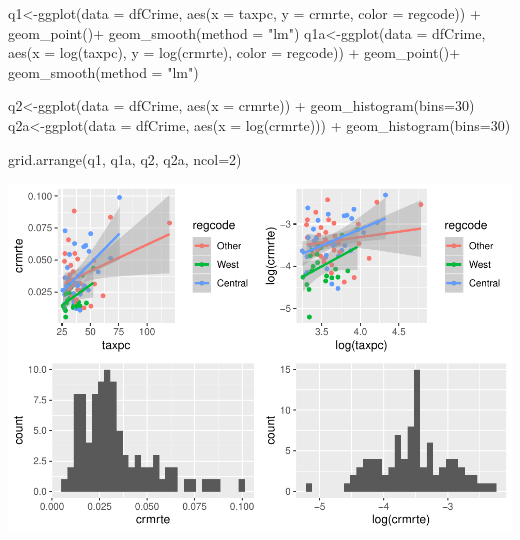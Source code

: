 \documentclass[]{article}
\newenvironment{Shaded}{}{}
\newcommand{\DataTypeTok}[1]{#1}
\newcommand{\DecValTok}[1]{#1}
\newcommand{\KeywordTok}[1]{\textcolor[rgb]{0.00,0.00,1.00}{#1}}
\newcommand{\NormalTok}[1]{#1}
\newcommand{\OperatorTok}[1]{#1}
\newcommand{\StringTok}[1]{\textcolor[rgb]{0.00,0.50,0.50}{#1}}
\begin{document}
\begin{Shaded}
\begin{Highlighting}[]
\NormalTok{q1<-}\KeywordTok{ggplot}\NormalTok{(}\DataTypeTok{data =}\NormalTok{ dfCrime, }\KeywordTok{aes}\NormalTok{(}\DataTypeTok{x =}\NormalTok{ taxpc, }\DataTypeTok{y =}\NormalTok{ crmrte, }\DataTypeTok{color =}\NormalTok{ regcode)) }\OperatorTok{+}
\StringTok{      }\KeywordTok{geom_point}\NormalTok{()}\OperatorTok{+}
\StringTok{  }\KeywordTok{geom_smooth}\NormalTok{(}\DataTypeTok{method =} \StringTok{"lm"}\NormalTok{)}
\NormalTok{q1a<-}\KeywordTok{ggplot}\NormalTok{(}\DataTypeTok{data =}\NormalTok{ dfCrime, }\KeywordTok{aes}\NormalTok{(}\DataTypeTok{x =} \KeywordTok{log}\NormalTok{(taxpc), }\DataTypeTok{y =} \KeywordTok{log}\NormalTok{(crmrte), }\DataTypeTok{color =}\NormalTok{ regcode)) }\OperatorTok{+}
\StringTok{      }\KeywordTok{geom_point}\NormalTok{()}\OperatorTok{+}
\StringTok{  }\KeywordTok{geom_smooth}\NormalTok{(}\DataTypeTok{method =} \StringTok{"lm"}\NormalTok{)}

\NormalTok{q2<-}\KeywordTok{ggplot}\NormalTok{(}\DataTypeTok{data =}\NormalTok{ dfCrime, }\KeywordTok{aes}\NormalTok{(}\DataTypeTok{x =}\NormalTok{ crmrte)) }\OperatorTok{+}
\StringTok{      }\KeywordTok{geom_histogram}\NormalTok{(}\DataTypeTok{bins=}\DecValTok{30}\NormalTok{)}
\NormalTok{q2a<-}\KeywordTok{ggplot}\NormalTok{(}\DataTypeTok{data =}\NormalTok{ dfCrime, }\KeywordTok{aes}\NormalTok{(}\DataTypeTok{x =} \KeywordTok{log}\NormalTok{(crmrte))) }\OperatorTok{+}
\StringTok{      }\KeywordTok{geom_histogram}\NormalTok{(}\DataTypeTok{bins=}\DecValTok{30}\NormalTok{)}

\KeywordTok{grid.arrange}\NormalTok{(q1, q1a, q2, q2a, }\DataTypeTok{ncol=}\DecValTok{2}\NormalTok{)}
\end{Highlighting}
\end{Shaded}

\includegraphics{Bagnard_Gaustad_Hartman_Leung_Lab_3_files/figure-latex/unnamed-chunk-98-1.pdf}
\end{document}
